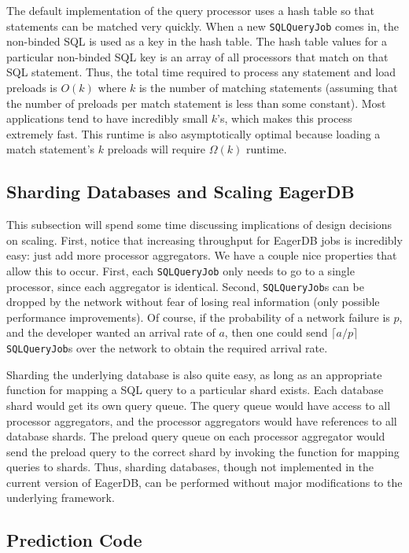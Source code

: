 \documentclass[12pt]{article}
\begin{document}
The default implementation of the query processor uses a hash table so that statements can be matched very quickly. When a new \texttt{SQLQueryJob} comes in, the non-binded SQL is used as a key in the hash table. The hash table values for a particular non-binded SQL key is an array of all processors that match on that SQL statement. Thus, the total time required to process any statement and load preloads is $O(k)$ where $k$ is the number of matching statements (assuming that the number of preloads per match statement is less than some constant). Most applications tend to have incredibly small $k$'s, which makes this process extremely fast. This runtime is also asymptotically optimal because loading a match statement's $k$ preloads will require $\Omega(k)$ runtime.

\subsection{Sharding Databases and Scaling EagerDB}

This subsection will spend some time discussing implications of design decisions on scaling. First, notice that increasing throughput for EagerDB jobs is incredibly easy: just add more processor aggregators. We have a couple nice properties that allow this to occur. First, each \texttt{SQLQueryJob} only needs to go to a single processor, since each aggregator is identical. Second, \texttt{SQLQueryJob}s can be dropped by the network without fear of losing real information (only possible performance improvements). Of course, if the probability of a network failure is $p$, and the developer wanted an arrival rate of $a$, then one could send $\lceil a/p \rceil$ \texttt{SQLQueryJob}s over the network to obtain the required arrival rate.

Sharding the underlying database is also quite easy, as long as an appropriate function for mapping a SQL query to a particular shard exists. Each database shard would get its own query queue. The query queue would have access to all processor aggregators, and the processor aggregators would have references to all database shards. The preload query queue on each processor aggregator would send the preload query to the correct shard by invoking the function for mapping queries to shards. Thus, sharding databases, though not implemented in the current version of EagerDB, can be performed without major modifications to the underlying framework.

\subsection{Prediction Code}
\end{document}
